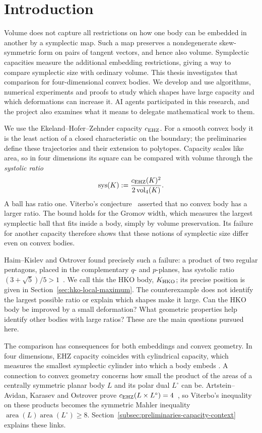 \section{Introduction}\label{sec:introduction}

Volume does not capture all restrictions on how one body can be embedded
in another by a symplectic map. Such a map preserves a nondegenerate
skew-symmetric form on pairs of tangent vectors, and hence also volume.
Symplectic capacities measure the additional embedding
restrictions, giving a way to compare symplectic size with ordinary volume.
This thesis investigates that comparison for four-dimensional convex
bodies. We develop and use algorithms, numerical experiments and proofs
to study which shapes have large capacity and which deformations can
increase it. AI agents participated in this research, and the project also
examines what it means to delegate mathematical work to them.

We use the Ekeland--Hofer--Zehnder capacity $c_{\rm EHZ}$. For a smooth
convex body it is the least action of a closed characteristic on the
boundary; the preliminaries define these trajectories and their extension
to polytopes. Capacity scales like area, so in four dimensions its square
can be compared with volume through the \emph{systolic ratio}
\[
 \operatorname{sys}(K):=
 \frac{c_{\rm EHZ}(K)^2}{2\operatorname{vol}_4(K)}.
\]
A ball has ratio one. Viterbo's conjecture~\cite{Viterbo2000} asserted that
no convex body has a larger ratio. The bound holds for the Gromov width,
which measures the largest symplectic ball that fits inside a body, simply
by volume preservation. Its failure for another capacity therefore shows
that these notions of symplectic size differ even on convex bodies.

Haim--Kislev and Ostrover found precisely such a failure: a product of two
regular pentagons, placed in the complementary $q$- and $p$-planes, has
systolic ratio $(3+\sqrt5)/5>1$~\cite{HaimKislevOstrover2024}.
We call this the HKO body, $K_{\rm HKO}$; its precise position is given in
Section~\ref{sec:hko-local-maximum}. The counterexample does not identify
the largest possible ratio or explain which shapes make it large. Can the
HKO body be improved by a small deformation? What geometric properties
help identify other bodies with large ratios? These are the main questions
pursued here.

The comparison has consequences for both embeddings and convex geometry.
In four dimensions, EHZ capacity coincides with cylindrical capacity,
which measures the smallest symplectic cylinder into which a body embeds
\cite[Corollary~1]{AbbondandoloEdtmairKang2024}. A connection to convex
geometry concerns how small the product of the areas of a centrally
symmetric planar body $L$ and its polar dual $L^\circ$ can be.
Artstein--Avidan, Karasev and Ostrover prove
$c_{\rm EHZ}(L\times L^\circ)=4$~\cite{AKO2014}, so Viterbo's inequality
on these products becomes the symmetric Mahler inequality
$\operatorname{area}(L)\operatorname{area}(L^\circ)\geq8$.
Section~\ref{subsec:preliminaries-capacity-context} explains these links.

